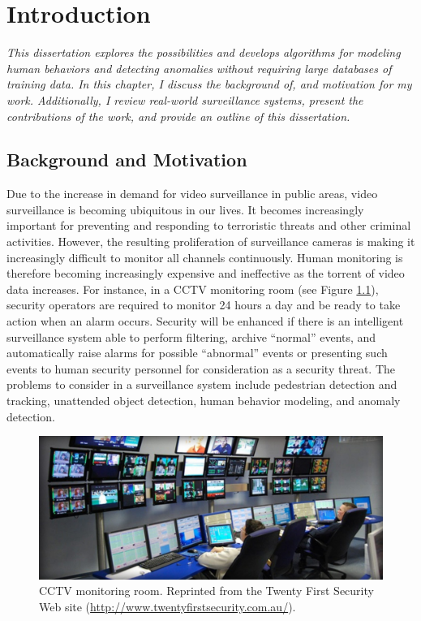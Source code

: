 \setlength{\footskip}{8mm}

\chapter{Introduction} 

\textit{This dissertation explores the possibilities and develops
algorithms for modeling human behaviors and detecting anomalies
without requiring large databases of training data. In this chapter, I
discuss the background of, and motivation for my work. Additionally, 
I review real-world surveillance systems, present the contributions of 
the work, and provide an outline of this dissertation.}

\section{Background and Motivation}

Due to the increase in demand for video surveillance in public areas,
video surveillance is becoming ubiquitous in our lives. It becomes
increasingly important for preventing and responding to terroristic 
threats and other criminal activities. However, the resulting proliferation of
surveillance cameras is making it increasingly difficult to monitor
all channels continuously. Human monitoring is therefore becoming
increasingly expensive and ineffective as the torrent of video data
increases. For instance, in a CCTV monitoring room (see
Figure \ref{fig:monitoring}), security operators are required to
monitor 24 hours a day and be ready to take action when an alarm
occurs. Security will be enhanced if there is an intelligent
surveillance system able to perform filtering, archive ``normal''
events, and automatically raise alarms for possible ``abnormal''
events or presenting such events to human security personnel for
consideration as a security threat. The problems to consider in a
surveillance system include pedestrian detection and tracking,
unattended object detection, human behavior modeling, and anomaly
detection.

\begin{figure}[t]
    \centering
    \includegraphics[width=5in]{figures/monitoring}
    \caption[CCTV monitoring room.]{\small CCTV monitoring
        room. Reprinted from the Twenty First Security Web site
        (\url{http://www.twentyfirstsecurity.com.au/}).}
    \label{fig:monitoring}
\end{figure}

